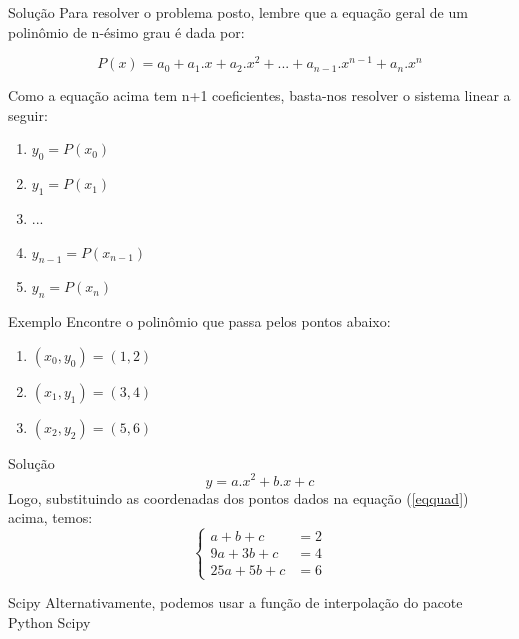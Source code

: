 \documentclass{beamer}
\begin{document}
	\begin{frame}{Solução}
		Para resolver o problema posto, lembre que a equação geral de um polinômio de n-ésimo grau é dada por:
		
		\begin{equation*}
		P(x)=a_0 + a_1 . x + a_2 . x^2 + ... + a_{n-1} . x^{n-1} + a_n . x^n
		\end{equation*}
		
		Como a equação acima tem  n+1 coeficientes, basta-nos  resolver o sistema linear a seguir:
		
		\begin{enumerate}
			\item $y_0 = P(x_0)$
			\item $y_1 = P(x_1)$
			\item ...
			\item $y_{n-1} = P(x_{n-1})$
			\item $y_n = P(x_n)$
		\end{enumerate}
	\end{frame}
	
	\begin{frame}{Exemplo}
		Encontre o polinômio que passa pelos pontos abaixo:
		\begin{enumerate}
			\item $(x_0,y_0)=(1,2)$
			\item $(x_1,y_1)=(3,4)$
			\item $(x_2,y_2)=(5,6)$
		\end{enumerate}
	\end{frame}
	
	
	
	
	\begin{frame}{Solução}
		\begin{equation}\label{eqquad}
		y=a.x^2+b.x+c
		\end{equation}
		Logo, substituindo as coordenadas dos pontos dados na equação (\ref{eqquad}) acima, temos:
		\begin{displaymath}\left\{
		\begin{array}{lr}
		a+b+c & = 2 \\
		9a+3b+c & = 4 \\
		25a+5b+c & = 6
		\end{array}
		\right.
		\end{displaymath}
	\end{frame}
	
	\begin{frame}{Scipy}
		Alternativamente, podemos usar a função de interpolação do pacote Python Scipy
	\end{frame}
	
\end{document}
